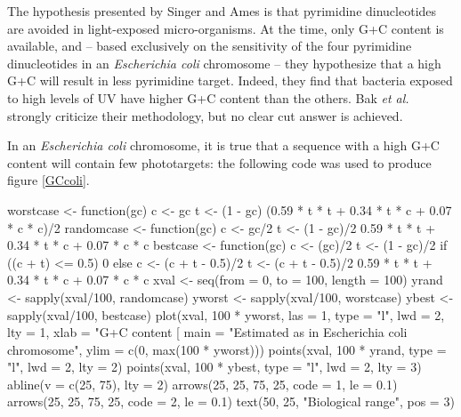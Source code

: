 \documentclass{article}
\begin{document}
The hypothesis presented by Singer and Ames \cite{Singer} is that
pyrimidine dinucleotides are avoided in light-exposed micro-organisms.
At the time, only G+C content is available, and -- based exclusively
on the sensitivity of the four pyrimidine dinucleotides in an
\textit{Escherichia coli} chromosome -- they hypothesize that a high
G+C will result in less pyrimidine target. Indeed, they find that
bacteria exposed to high levels of UV have higher G+C content than the
others. Bak \textit{et al.} \cite{Bak} strongly criticize their
methodology, but no clear cut answer is achieved.

In an \textit{Escherichia coli} chromosome, it is true that a sequence
with a high G+C content will contain few phototargets: the following
code was used to produce figure \ref{GCcoli}.

\begin{Schunk}
\begin{Sinput}
 worstcase <- function(gc) {
     c <- gc
     t <- (1 - gc)
     (0.59 * t * t + 0.34 * t * c + 0.07 * c * c)/2
 }
 randomcase <- function(gc) {
     c <- gc/2
     t <- (1 - gc)/2
     0.59 * t * t + 0.34 * t * c + 0.07 * c * c
 }
 bestcase <- function(gc) {
     c <- (gc)/2
     t <- (1 - gc)/2
     if ((c + t) <= 0.5) {
         0
     }
     else {
         c <- (c + t - 0.5)/2
         t <- (c + t - 0.5)/2
         0.59 * t * t + 0.34 * t * c + 0.07 * c * c
     }
 }
 xval <- seq(from = 0, to = 100, length = 100)
 yrand <- sapply(xval/100, randomcase)
 yworst <- sapply(xval/100, worstcase)
 ybest <- sapply(xval/100, bestcase)
 plot(xval, 100 * yworst, las = 1, type = "l", lwd = 2, lty = 1, 
     xlab = "G+C content [%
     main = "Estimated as in Escherichia coli chromosome", 
     ylim = c(0, max(100 * yworst)))
 points(xval, 100 * yrand, type = "l", lwd = 2, lty = 2)
 points(xval, 100 * ybest, type = "l", lwd = 2, lty = 3)
 abline(v = c(25, 75), lty = 2)
 arrows(25, 25, 75, 25, code = 1, le = 0.1)
 arrows(25, 25, 75, 25, code = 2, le = 0.1)
 text(50, 25, "Biological range", pos = 3)
\end{Sinput}
\end{Schunk}
\end{document}
